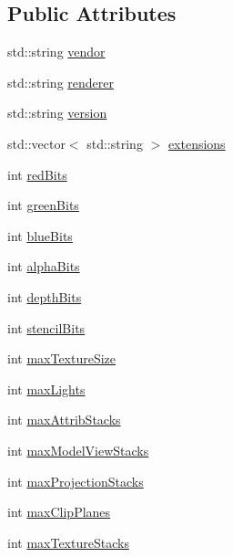 \subsection*{Public Attributes}
\begin{DoxyCompactItemize}
\item 
std\-::string \hyperlink{structglInfo_a8d6952c9ef0c2f4d7311f448482509af}{vendor}
\item 
std\-::string \hyperlink{structglInfo_ad6eee9cd07b1c1d39bce1294bbf4f025}{renderer}
\item 
std\-::string \hyperlink{structglInfo_a3c189d62cff793f67c7df3d4d1992eda}{version}
\item 
std\-::vector$<$ std\-::string $>$ \hyperlink{structglInfo_acf0baeef3c59256b5421e7f3a02f5e89}{extensions}
\item 
int \hyperlink{structglInfo_a8ca02246f86e2c1872772e468fa7b510}{red\-Bits}
\item 
int \hyperlink{structglInfo_aac9180e543cb14496c2ee225268e4d70}{green\-Bits}
\item 
int \hyperlink{structglInfo_ab297321b61208d90c5e929a39462f7f2}{blue\-Bits}
\item 
int \hyperlink{structglInfo_ac1f6ab1145051cb46ecf0716c0d5a453}{alpha\-Bits}
\item 
int \hyperlink{structglInfo_a7c10c7ae71e40d05e16dd29d5402505e}{depth\-Bits}
\item 
int \hyperlink{structglInfo_ae845cb4ded351fd5d12435220e6e185d}{stencil\-Bits}
\item 
int \hyperlink{structglInfo_afbde9a0fb66cc337cc0b1e5b48c2562d}{max\-Texture\-Size}
\item 
int \hyperlink{structglInfo_a8ca045798dcecb9331233410575a2648}{max\-Lights}
\item 
int \hyperlink{structglInfo_a2032498ee944c2e0d18395d54736aaee}{max\-Attrib\-Stacks}
\item 
int \hyperlink{structglInfo_a8fe530a903dc0e940d411088ca3babc2}{max\-Model\-View\-Stacks}
\item 
int \hyperlink{structglInfo_a1c2c13828297dc283a16ce0c1d15a137}{max\-Projection\-Stacks}
\item 
int \hyperlink{structglInfo_a0de92684a9e00e09d64137f2d86f472d}{max\-Clip\-Planes}
\item 
int \hyperlink{structglInfo_a6b9e47f0d7b9237b607bb6dad38527fb}{max\-Texture\-Stacks}
\end{DoxyCompactItemize}


